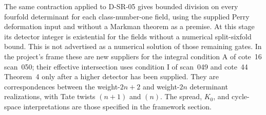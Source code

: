 The same contraction applied to D-SR-05 gives bounded division on
every fourfold determinant for each class-number-one field, using
the supplied Perry deformation input and without a Markman theorem
as a premise. At this stage its detector integer is existential for
the fields without a numerical split-sixfold bound. This is not
advertised as a numerical solution of those remaining gates.
In the project's frame these are new suppliers for the integral
condition A of cote~16 scan~050; their effective intersection uses
condition I of scan~049 and cote~44 Theorem~4 only after a higher
detector has been supplied. They are correspondences between the
weight-$2n+2$ and weight-$2n$ determinant realizations, with Tate
twists $(n+1)$ and $(n)$. The spread, $K_0$, and cycle-space
interpretations are those specified in the framework section.
